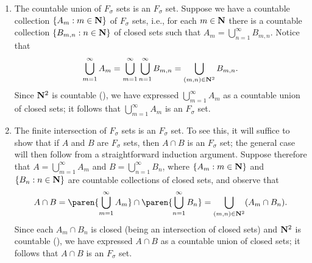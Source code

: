 \documentclass{lew98_solutions}
\begin{document}
\begin{solution}
    \begin{enumerate}
        \item The countable union of \( F_{\sigma} \) sets is an \( F_{\sigma} \) set. Suppose we have a countable collection \( \{ A_m : m \in \mathbf{N} \} \) of \( F_{\sigma} \) sets, i.e., for each \( m \in \mathbf{N} \) there is a countable collection \( \{ B_{m,n} : n \in \mathbf{N} \} \) of closed sets such that \( A_m = \bigcup_{n=1}^{\infty} B_{m,n} \). Notice that
        \[
            \bigcup_{m=1}^{\infty} A_m = \bigcup_{m=1}^{\infty} \bigcup_{n=1}^{\infty} B_{m,n} = \bigcup_{(m, n) \in \mathbf{N}^2} B_{m,n}.
        \]
        Since \( \mathbf{N}^2 \) is countable (), we have expressed \( \bigcup_{m=1}^{\infty} A_m \) as a countable union of closed sets; it follows that \( \bigcup_{m=1}^{\infty} A_m \) is an \( F_{\sigma} \) set.

        \item The finite intersection of \( F_{\sigma} \) sets is an \( F_{\sigma} \) set. To see this, it will suffice to show that if \( A \) and \( B \) are \( F_{\sigma} \) sets, then \( A \cap B \) is an \( F_{\sigma} \) set; the general case will then follow from a straightforward induction argument. Suppose therefore that \( A = \bigcup_{m=1}^{\infty} A_m \) and \( B = \bigcup_{n=1}^{\infty} B_n \), where \( \{ A_m : m \in \mathbf{N} \} \) and \( \{ B_n : n \in \mathbf{N} \} \) are countable collections of closed sets, and observe that
        \[
            A \cap B = \paren{ \bigcup_{m=1}^{\infty} A_m } \cap \paren{ \bigcup_{n=1}^{\infty} B_n } = \bigcup_{(m, n) \in \N^2} (A_m \cap B_n).
        \]
        Since each \( A_m \cap B_n \) is closed (being an intersection of closed sets) and \( \mathbf{N}^2 \) is countable (), we have expressed \( A \cap B \) as a countable union of closed sets; it follows that \( A \cap B \) is an \( F_{\sigma} \) set.


\end{enumerate}
\end{solution}
\end{document}
